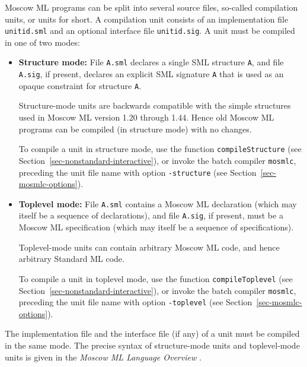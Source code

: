 \documentclass[fleqn,a4paper]{article}
\begin{document}
Moscow ML programs can be split into several source files, so-called
compilation units, or units for short.  A compilation unit consists of
an implementation file \texttt{unitid.sml} and an optional interface
file \texttt{unitid.sig}.  A unit must be compiled in one of two modes:

\begin{itemize}
\item \textbf{Structure mode:} File \texttt{A.sml} declares a single
  SML structure \texttt{A}, and file \texttt{A.sig}, if present,
  declares an explicit SML signature \texttt{A} that is used as an
  opaque constraint for structure \texttt{A}.

  
  Structure-mode units are backwards compatible with the simple
  structures used in Moscow ML version 1.20 through 1.44.  Hence old
  Moscow ML programs can be compiled (in structure mode) with no
  changes.
  
  To compile a unit in structure mode, use the function
  \texttt{compileStructure} (see
  Section~\ref{sec-nonstandard-interactive}), or invoke the batch
  compiler \texttt{mosmlc}, preceding the unit file name with option
  \texttt{-structure} (see Section~\ref{sec-mosmlc-options}).
  
\item \textbf{Toplevel mode:} File \texttt{A.sml} contains a Moscow ML
  declaration (which may itself be a sequence of declarations), and
  file \texttt{A.sig}, if present, must be a Moscow ML specification
  (which may itself be a sequence of specifications).

  Toplevel-mode units can contain arbitrary Moscow ML code, and hence
  arbitrary Standard ML code.
  
  To compile a unit in toplevel mode, use the function
  \texttt{compileToplevel} (see
  Section~\ref{sec-nonstandard-interactive}), or invoke the batch
  compiler \texttt{mosmlc}, preceding the unit file name with option
  \texttt{-toplevel} (see Section~\ref{sec-mosmlc-options}).

\end{itemize}

\noindent 
The implementation file and the interface file (if any) of a unit must
be compiled in the same mode.  The precise syntax of structure-mode
units and toplevel-mode units is given in the \emph{Moscow ML Language
  Overview} \cite{MoscowML:2000:MoscowMLLanguage}.
\end{document}
